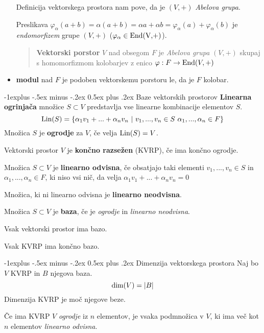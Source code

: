 \documentclass[a4paper,8pt]{extarticle}
\makeatletter
\renewcommand{\subsection}{\@startsection{subsection}{2}{0mm}%
                                {-1explus -.5ex minus -.2ex}%
                                {0.5ex plus .2ex}%
                                {\normalfont\normalsize\bfseries}}
\makeatother
\begin{document}
\begin{multicols}{3}
\begin{itemize}
    Definicija vektorskega prostora nam pove, da je $(V,+)$ \emph{Abelova grupa}.

    Preslikava $\varphi_\alpha(a+b) = \alpha(a+b) = \alpha a + \alpha b = \varphi_\alpha(a) + \varphi_\alpha(b)$
    je \emph{endomorfizem} grupe $(V, +)$ ($\varphi_\alpha \in \textmd{End(V,+)}$).

    \begin{quotation}
        \textbf{Vektorski porstor} $V$ nad obsegom $F$ je \emph{Abelova grupa} $(V, +)$ skupaj s 
        homomorfizmom kolobarjev z enico $\varphi : F \to \textmd{End}(V, +)$
    \end{quotation}

    \item \textbf{modul} nad $F$ je podoben vektorskemu porstoru le, da je $F$ kolobar.
\end{itemize}

\subsection{Baze vektorskih prostorov}
\textbf{Linearna ogrinjača} množice $S \subset V$ predstavlja vse linearne kombinacije elementov $S$.
\[
    \textmd{Lin}(S) = \{\alpha_1 v_1 + ... + \alpha_n v_n \ | \ v_1, ..., v_n \in S \ \alpha_1, ..., \alpha_n \in F  \}
\]
Množica $S$ je \textbf{ogrodje} za $V$, če velja $\textmd{Lin}(S) = V$.

Vektorski prostor $V$ je \textbf{končno razsežen} (KVRP), če ima končno ogrodje.

Množica $S \subset V$ je \textbf{linearno odvisna}, če obsatjajo taki elementi $v_1, ..., v_n \in S$ in 
$\alpha_1,...,\alpha_n \in F$,
ki niso vsi nič, da velja $\alpha_1 v_1 + ... + \alpha_n v_n = 0$

Množica, ki ni linearno odvisna je \textbf{linearno neodvisna}.

Množica $S \subset V$ je \textbf{baza}, če je \emph{ogrodje} in \emph{linearno neodvisna}.

Vsak vektorski prostor ima bazo.

Vsak KVRP ima končno bazo.

\subsection{Dimenzija vektorskega prostora}
Naj bo $V$ KVRP in $B$ njegova baza.
\[\textmd{dim}(V) = |B|\]
Dimenzija KVRP je moč njegove beze.

Če ima KVRP $V$ \emph{ogrodje} iz $n$ elementov, je vsaka podmnožica v $V$, ki ima več kot $n$ elementov 
\emph{linearno odvisna}.


\end{multicols}
\end{document}

